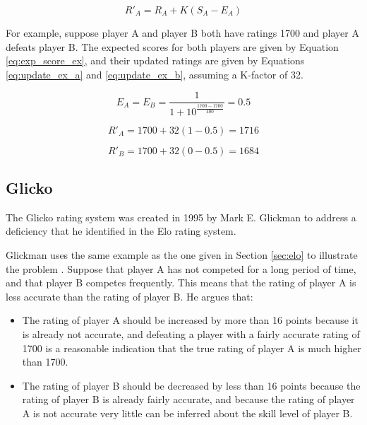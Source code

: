 \begin{equation} \label{eq:update}
R'_A = R_A + K \left( S_A - E_A \right)
\end{equation}

For example, suppose player A and player B both have ratings 1700 and player A defeats player B.
The expected scores for both players are given by Equation \ref{eq:exp_score_ex}, and their updated ratings are given by Equations \ref{eq:update_ex_a} and \ref{eq:update_ex_b}, assuming a K-factor of 32.

\begin{equation} \label{eq:exp_score_ex}
E_A = E_B = \frac{1}{1 + 10^\frac{1700 - 1700}{400}} = 0.5
\end{equation}

\begin{equation} \label{eq:update_ex_a}
R'_A = 1700 + 32 \left( 1 - 0.5 \right) = 1716
\end{equation}

\begin{equation} \label{eq:update_ex_b}
R'_B = 1700 + 32 \left( 0 - 0.5 \right) = 1684
\end{equation}

\subsection{Glicko}
\label{sec:glicko}
The Glicko rating system was created in 1995 by Mark E. Glickman to address a deficiency that he identified in the Elo rating system.

Glickman uses the same example as the one given in Section \ref{sec:elo} to illustrate the problem \cite{glicko}.
Suppose that player A has not competed for a long period of time, and that player B competes frequently.
This means that the rating of player A is less accurate than the rating of player B.
He argues that:

\begin{itemize}
	\item{The rating of player A should be increased by more than 16 points because it is already not accurate, and defeating a player with a fairly accurate rating of 1700 is a reasonable indication that the true rating of player A is much higher than 1700.}
	\item{The rating of player B should be decreased by less than 16 points because the rating of player B is already fairly accurate, and because the rating of player A is not accurate very little can be inferred about the skill level of player B.}
\end{itemize}

